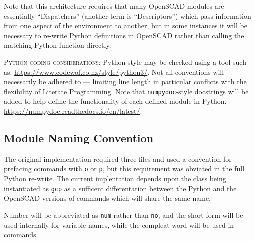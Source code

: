 \documentclass{ltxdoc}
\begin{document}
\noindent Note that this architecture requires that many OpenSCAD modules are essentially ``Dispatchers'' (another term is ``Descriptors'') which pass information from one aspect of the environment to another, but in some instances it will be necessary to re-write Python definitions in OpenSCAD rather than calling the matching Python function directly.

\smallskip

\noindent\textsc{Python coding considerations:} Python style may be checked using a tool such as: \url{https://www.codewof.co.nz/style/python3/}. Not all conventions will necessarily be adhered to --- limiting line length in particular conflicts with the flexibility of Literate Programming. Note that \verb|numpydoc|-style docstrings will be added to help define the functionality of each defined module in Python. \url{https://numpydoc.readthedocs.io/en/latest/}.

\subsection{Module Naming Convention}

The original implementation required three files and used a convention for prefacing commands with \verb|o| or \verb|p|, but this requirement was obviated in the full Python re-write. The current implentation depends upon the class being instantiated as \verb|gcp| as a sufficent differentation between the Python and the OpenSCAD versions of commands which will share the same name.


Number will be abbreviated as \verb|num| rather than \verb|no|, and the short form will be used internally for variable names, while the compleat word will be used in commands.
\end{document}
